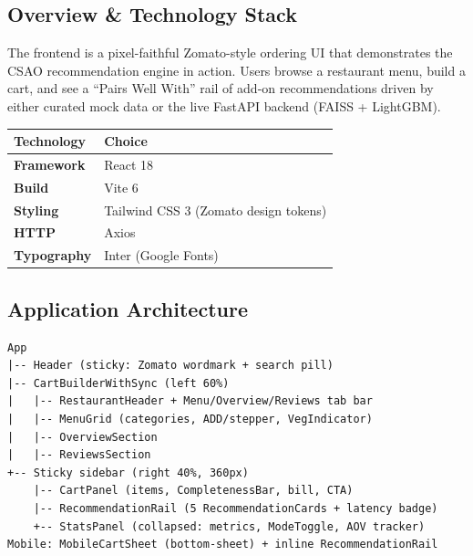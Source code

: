 \documentclass[11pt,a4paper]{article}
\begin{document}
\subsection{Overview \& Technology Stack}

\begin{execbox}[title=Demo UI Purpose]
The frontend is a pixel-faithful Zomato-style ordering UI that demonstrates
the CSAO recommendation engine in action. Users browse a restaurant menu,
build a cart, and see a ``Pairs Well With'' rail of add-on recommendations
driven by either curated mock data or the live FastAPI backend (FAISS + LightGBM).
\end{execbox}

\medskip
{\small
\begin{center}
\begin{tabularx}{\linewidth}{>{\bfseries\RaggedRight\arraybackslash}p{2.2cm} >{\RaggedRight\arraybackslash}X}
  \toprule
  \textbf{Technology} & \textbf{Choice} \\
  \midrule
  Framework   & React 18 \\
  Build       & Vite 6 \\
  Styling     & Tailwind CSS 3 (Zomato design tokens) \\
  HTTP        & Axios \\
  Typography  & Inter (Google Fonts) \\
  \bottomrule
\end{tabularx}
\end{center}
}

\subsection{Application Architecture}

\begin{archbox}
\begin{lstlisting}[basicstyle=\small\ttfamily, columns=fullflexible]
App
|-- Header (sticky: Zomato wordmark + search pill)
|-- CartBuilderWithSync (left 60%)
|   |-- RestaurantHeader + Menu/Overview/Reviews tab bar
|   |-- MenuGrid (categories, ADD/stepper, VegIndicator)
|   |-- OverviewSection
|   |-- ReviewsSection
+-- Sticky sidebar (right 40%, 360px)
    |-- CartPanel (items, CompletenessBar, bill, CTA)
    |-- RecommendationRail (5 RecommendationCards + latency badge)
    +-- StatsPanel (collapsed: metrics, ModeToggle, AOV tracker)
Mobile: MobileCartSheet (bottom-sheet) + inline RecommendationRail
\end{lstlisting}
\end{archbox}
\end{document}

